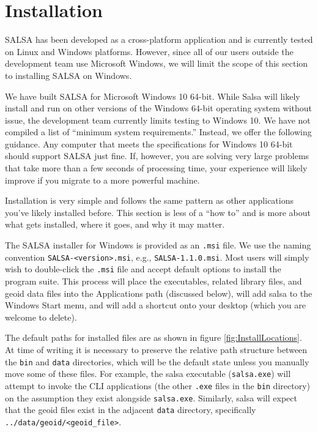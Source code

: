 \section{Installation}

SALSA has been developed as a cross-platform application and is currently tested on Linux and Windows platforms.  However, since all of our users outside the development team use Microsoft Windows, we will limit the scope of this section to installing SALSA on Windows.

We have built SALSA for Microsoft Windows 10 64-bit. While Salsa will likely install and run on other versions of the Windows 64-bit operating system without issue, the development team currently limits testing to Windows 10.  We have not compiled a list of ``minimum system requirements.''  Instead, we offer the following guidance.  Any computer that meets the specifications for Windows 10 64-bit should support SALSA just fine.  If, however, you are solving very large problems that take more than a few seconds of processing time, your experience will likely improve if you migrate to a more powerful machine.

Installation is very simple and follows the same pattern as other applications you've likely installed before.  This section is less of a ``how to'' and is more about what gets installed, where it goes, and why it may matter.

The SALSA installer for Windows is provided as an \verb+.msi+ file.  We use the naming convention \verb+SALSA-<version>.msi+, e.g., \verb+SALSA-1.1.0.msi+.  Most users will simply wish to double-click the \verb+.msi+ file and accept default options to install the program suite.  This process will place the executables, related library files, and geoid data files into the Applications path (discussed below), will add \textsf{salsa} to the Windows Start menu, and will add a shortcut onto your desktop (which you are welcome to delete).

The default paths for installed files are as shown in figure \ref{fig:InstallLocations}.  At time of writing it is necessary to preserve the relative path structure between the \verb+bin+ and \verb+data+ directories, which will be the default state unless you manually move some of these files.  For example, the \textsf{salsa} executable (\verb+salsa.exe+) will attempt to invoke the CLI applications (the other \verb+.exe+ files in the \verb+bin+ directory) on the assumption they exist alongside \verb+salsa.exe+.  Similarly, \textsf{salsa} will expect that the geoid files exist in the adjacent \verb+data+ directory, specifically \verb+../data/geoid/<geoid_file>+.


